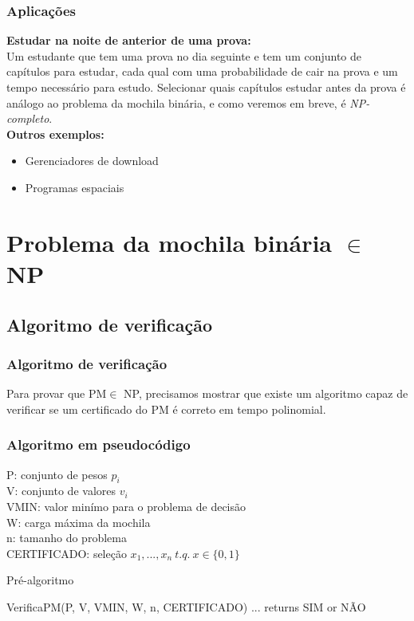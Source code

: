 \documentclass{beamer}
\begin{document}
\begin{frame}
    \frametitle{Aplicações}
    \textbf{Estudar na noite de anterior de uma prova:} \\
    Um estudante que tem uma prova no dia seguinte e tem um conjunto
    de capítulos para estudar, cada qual com uma probabilidade de cair
    na prova e um tempo necessário para estudo. Selecionar quais capítulos
    estudar antes da prova é análogo ao problema da mochila binária, e como
    veremos em breve, é \textit{NP-completo}. \\
    
    \textbf{Outros exemplos:} \\
    \begin{itemize}
        \item
            Gerenciadores de download
        \item
            Programas espaciais

    \end{itemize}


\end{frame}


\section{Problema da mochila binária $\in$ NP}

\subsection{Algoritmo de verificação}
\begin{frame}
    \frametitle{Algoritmo de verificação}
    Para provar que PM\footnotemark $\in$ NP, precisamos mostrar que existe um algoritmo
    capaz de verificar se um certificado do PM é correto em tempo polinomial.

\end{frame}


\begin{frame}[fragile]
    \frametitle{Algoritmo em pseudocódigo}

    P: conjunto de pesos $p_{i}$ \\
    V: conjunto de valores $v_{i}$ \\
    VMIN: valor minímo para o problema de decisão \\
    W: carga máxima da mochila \\
    n: tamanho do problema \\
    CERTIFICADO: seleção $x_{1},...,x_{n}\ t.q.\ x \in \{0,1\}$ \\

    \begin{block}{Pré-algoritmo}
    \begin{semiverbatim}
    VerificaPM(P, V, VMIN, W, n, CERTIFICADO)
        ...
        returns SIM or NÃO
    \end{semiverbatim}
    \end{block}

\end{frame}
\end{document}
